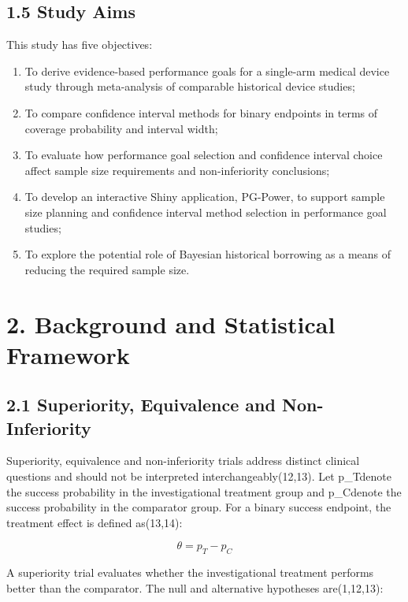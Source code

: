 \documentclass{article}
\providecommand{\tightlist}{%
  \setlength{\itemsep}{0pt}\setlength{\parskip}{0pt}}
\begin{document}
\subsection{1.5 Study Aims}\label{study-aims}

This study has five objectives:

\begin{enumerate}
\def\labelenumi{\arabic{enumi}.}
\tightlist
\item
  To derive evidence-based performance goals for a single-arm medical
  device study through meta-analysis of comparable historical device
  studies;
\item
  To compare confidence interval methods for binary endpoints in terms
  of coverage probability and interval width;
\item
  To evaluate how performance goal selection and confidence interval
  choice affect sample size requirements and non-inferiority
  conclusions;
\item
  To develop an interactive Shiny application, PG-Power, to support
  sample size planning and confidence interval method selection in
  performance goal studies;
\item
  To explore the potential role of Bayesian historical borrowing as a
  means of reducing the required sample size.
\end{enumerate}

\section{2. Background and Statistical
Framework}\label{background-and-statistical-framework}

\subsection{2.1 Superiority, Equivalence and
Non-Inferiority}\label{superiority-equivalence-and-non-inferiority}

Superiority, equivalence and non-inferiority trials address distinct
clinical questions and should not be interpreted interchangeably(12,13).
Let p\_Tdenote the success probability in the investigational treatment
group and p\_Cdenote the success probability in the comparator group.
For a binary success endpoint, the treatment effect is defined
as(13,14):

\[\theta = p_T - p_C\]

A superiority trial evaluates whether the investigational treatment
performs better than the comparator. The null and alternative hypotheses
are(1,12,13):
\end{document}
